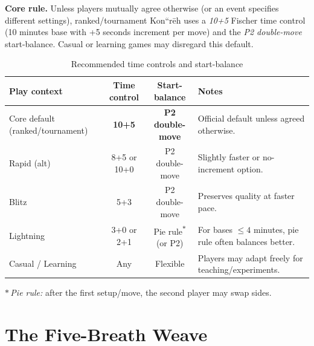 \documentclass[11pt]{article}
\renewcommand{\arraystretch}{1.15}
\begin{document}
\noindent\textbf{Core rule.} Unless players mutually agree otherwise (or an event specifies different settings), ranked/tournament Kon``rēh uses a \emph{10+5} Fischer time control (10 minutes base with +5 seconds increment per move) and the \emph{P2 double-move} start-balance. Casual or learning games may disregard this default.

\begin{table}[h!]
\centering
\caption{Recommended time controls and start-balance}
\label{tab:time_controls}
\renewcommand{\arraystretch}{1.2}
\begin{tabular}{l c c l}
\hline
\textbf{Play context} & \textbf{Time control} & \textbf{Start-balance} & \textbf{Notes} \\
\hline
Core default (ranked/tournament) & \textbf{10+5} & \textbf{P2 double-move} & Official default unless agreed otherwise. \\
Rapid (alt) & 8+5 or 10+0 & P2 double-move & Slightly faster or no-increment option. \\
Blitz & 5+3 & P2 double-move & Preserves quality at faster pace. \\
Lightning & 3+0 or 2+1 & Pie rule\textsuperscript{$\ast$} (or P2) & For bases $\leq 4$ minutes, pie rule often balances better. \\
Casual / Learning & Any & Flexible & Players may adapt freely for teaching/experiments. \\
\hline
\end{tabular}

\vspace{4pt}
\footnotesize $\ast$\,\textit{Pie rule:} after the first setup/move, the second player may swap sides.
\end{table}

\clearpage
\section{The Five-Breath Weave}
\label{sec:five-breath-weave}
\end{document}

